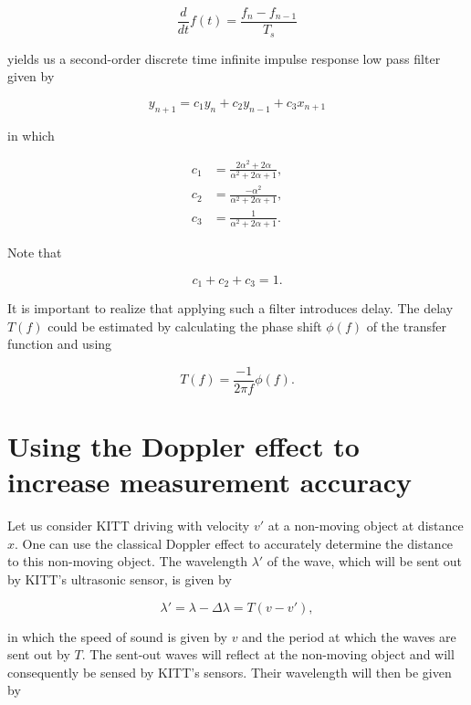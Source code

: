\documentclass[11pt,titlepage]{report}
\begin{document}
\begin{appendices}
\begin{equation}
	\frac{d}{dt}f(t) = \frac{f_n - f_{n-1}}{T_s}
\end{equation}

yields us a second-order discrete time infinite impulse response low pass filter given by

\begin{equation}
	y_{n+1} = c_1 y_n + c_2 y_{n-1} + c_3 x_{n+1}
\end{equation}

in which

\begin{align}
	c_1 &= \frac{2 \alpha^2 + 2 \alpha}{\alpha^2 + 2 \alpha + 1}, \\
	c_2 &= \frac{-\alpha^2}{\alpha^2 + 2 \alpha + 1}, \\
	c_3 &= \frac{1}{\alpha^2+2 \alpha + 1}.
\end{align}

Note that

\begin{equation}
	c_1 + c_2 + c_3 = 1.
\end{equation}

It is important to realize that applying such a filter introduces delay. The delay $T(f)$ could be estimated by calculating the phase shift $\phi(f)$ of the transfer function and using

\begin{equation}
	T(f) = \frac{-1}{2 \pi f} \phi(f).
\end{equation}

\chapter{Using the Doppler effect to increase measurement accuracy}
\label{app:doppler}
Let us consider KITT driving with velocity $v'$ at a non-moving object at distance $x$. One can use the classical Doppler effect to accurately determine the distance to this non-moving object. The wavelength $\lambda'$ of the wave, which will be sent out by KITT's ultrasonic sensor, is given by

\begin{equation}
	\lambda' = \lambda - \Delta \lambda = T (v - v'),
\end{equation}

in which the speed of sound is given by $v$ and the period at which the waves are sent out by $T$. The sent-out waves will reflect at the non-moving object and will consequently be sensed by KITT's sensors. Their wavelength will then be given by


\end{appendices}
\end{document}
